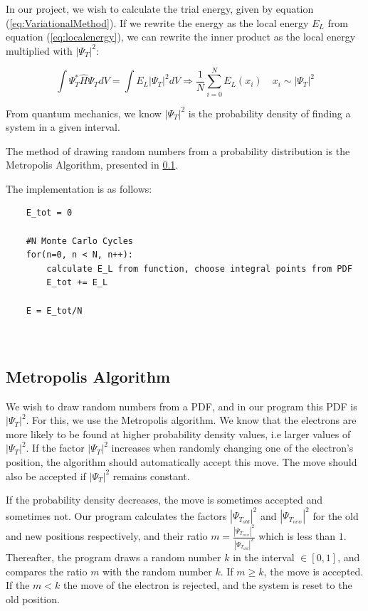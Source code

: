 \documentclass[norsk,a4paper,12pt]{article}
\begin{document}
In our project, we wish to calculate the trial energy, given by equation (\ref{eq:VariationalMethod}). If we rewrite the energy as the local energy $E_L$ from equation (\ref{eq:localenergy}), we can rewrite the inner product as the local energy multiplied with $|\Psi_T|^2$:

\begin{equation}
    \int \Psi_T^* \hat{H} \Psi_T dV = \int E_L |\Psi_T|^2 dV \Rightarrow \frac{1}{N} \sum_{i=0}^N E_L(x_i) \quad x_i \sim |\Psi_T|^2  
\end{equation}

From quantum mechanics, we know $|\Psi_T|^2$ is the probability density of finding a system in a given interval. 

The method of drawing random numbers from a probability distribution is the Metropolis Algorithm, presented in \ref{MetropolisAlgorithm}. 

The implementation is as follows:

\begin{lstlisting}
    E_tot = 0
    
    #N Monte Carlo Cycles
    for(n=0, n < N, n++):
        calculate E_L from function, choose integral points from PDF
        E_tot += E_L
        
    E = E_tot/N
        
    
\end{lstlisting}

\subsection{Metropolis Algorithm} \label{MetropolisAlgorithm}
We wish to draw random numbers from a PDF, and in our program this PDF is $|\Psi_T|^2$. For this, we use the Metropolis algorithm. We know that the electrons are more likely to be found at higher probability density values, i.e larger values of $|\Psi_T|^2$. If the factor $|\Psi_T|^2$ increases when randomly changing one of the electron's position, the algorithm should automatically accept this move. The move should also be accepted if $|\Psi_T|^2$ remains constant.

\par 
\vspace{2mm}

If the probability density decreases, the move is sometimes accepted and sometimes not. Our program calculates the factors $|\Psi_{T_{old}}|^2$ and $|\Psi_{T_{new}}|^2$ for the old and new positions respectively, and their ratio $ m = \frac{|\Psi_{T_{new}}|^2}{|\Psi_{T_{old}}|^2}$ which is less than $1$. Thereafter, the program draws a random number $k$ in the interval $\in [0, 1]$, and compares the ratio $m$ with the random number $k$. If $m \geq k$, the move is accepted. If the $m < k$ the move of the electron is rejected, and the system is reset to the old position. 
\end{document}
